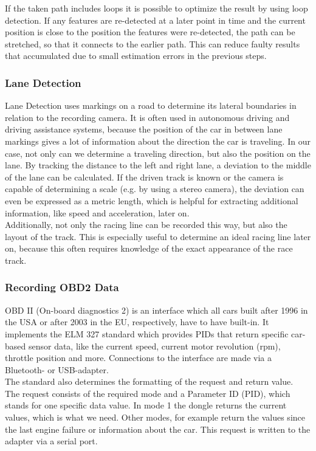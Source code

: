 If the taken path includes loops it is possible to optimize the result by using loop detection. If any features are re-detected at a later point in time and the current position is close to the position the features were re-detected, the path can be stretched, so that it connects to the earlier path.
This can reduce faulty results that accumulated due to small estimation errors in the previous steps.

\subsubsection{Lane Detection}
Lane Detection uses markings on a road to determine its lateral boundaries in relation to the recording camera. It is often used in autonomous driving and driving assistance systems, because the position of the car in between lane markings gives a lot of information about the direction the car is traveling. 
In our case, not only can we determine a traveling direction, but also the position on the lane.
By tracking the distance to the left and right lane, a deviation to the middle of the lane can be calculated. 
If the driven track is known or the camera is capable of determining a scale (e.g. by using a stereo camera), the deviation can even be expressed as a metric length, which is helpful for extracting additional information, like speed and acceleration, later on.\\
Additionally, not only the racing line can be recorded this way, but also the layout of the track. This is especially useful to determine an ideal racing line later on, because this often requires knowledge of the exact appearance of the race track.

\subsubsection{Recording OBD2 Data}
OBD II (On-board diagnostics 2) is an interface which all cars built after 1996 in the USA or after 2003 in the EU, respectively, have to have built-in. It implements the ELM 327 standard which provides PIDs that return specific car-based sensor data, like the current speed, current motor revolution (rpm), throttle position and more. Connections to the interface are made via a Bluetooth- or USB-adapter.\\
The standard also determines the formatting of the request and return value.\\
The request consists of the required mode and a Parameter ID (PID), which stands for one specific data value. In mode 1 the dongle returns the current values, which is what we need. Other modes, for example return the values since the last engine failure or information about the car. This request is written to the adapter via a serial port.

